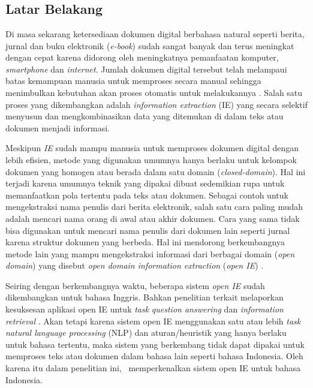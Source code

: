 \chapter{\babSatu}

\section{Latar Belakang}
Di masa sekarang ketersediaan dokumen digital berbahasa natural seperti berita, jurnal dan buku elektronik (\textit{e-book}) sudah sangat banyak dan terus meningkat dengan cepat karena didorong oleh meningkatnya pemanfaatan komputer, \textit{smartphone} dan \textit{internet}. Jumlah dokumen digital tersebut telah melampaui batas kemampuan manusia untuk memproses secara manual sehingga menimbulkan kebutuhan akan proses otomatis untuk melakukannya \citep{banko2007open}. Salah satu proses yang dikembangkan adalah \textit{information extraction} (IE) yang secara selektif menyusun dan mengkombinasikan data yang ditemukan di dalam teks atau dokumen menjadi informasi\citep{cowie1996information}.

Meskipun \textit{IE} sudah mampu manusia untuk memproses dokumen digital dengan lebih efisien, metode yang digunakan umumnya hanya berlaku untuk kelompok dokumen yang homogen atau berada dalam satu domain (\textit{closed-domain}). Hal ini terjadi karena umumnya teknik yang dipakai dibuat sedemikian rupa untuk memanfaatkan pola tertentu pada teks atau dokumen\citep{cowie1996information}. Sebagai contoh untuk mengekstraksi nama penulis dari berita elektronik, salah satu cara paling mudah adalah mencari nama orang di awal atau akhir dokumen. Cara yang sama tidak bisa digunakan untuk mencari nama penulis dari dokumen lain seperti jurnal karena struktur dokumen yang berbeda. Hal ini mendorong berkembangnya metode lain yang mampu mengekstraksi informasi dari berbagai domain (\textit{open domain}) yang disebut \textit{open domain information extraction} (\textit{open IE}) \citep{banko2007open}.

Seiring dengan berkembangnya waktu, beberapa sistem \textit{open IE} sudah dikembangkan \citep{schmitz2012open} untuk bahasa Inggris. Bahkan penelitian terkait melaporkan kesuksesan aplikasi open IE untuk \textit{task} \textit{question answering} \citep{fader2011identifying} dan \textit{information retrieval} \citep{etzioni2011search}. Akan tetapi karena sistem open IE menggunakan satu atau lebih \textit{task natural language processing} (NLP) dan aturan/heuristik yang hanya berlaku untuk bahasa tertentu, maka sistem yang berkembang tidak dapat dipakai untuk memproses teks atau dokumen dalam bahasa lain seperti bahasa Indonesia. Oleh karena itu dalam penelitian ini, \saya~memperkenalkan sistem open IE untuk bahasa Indonesia.

